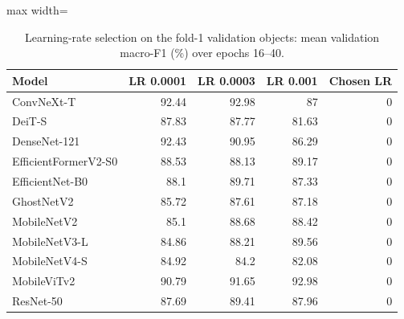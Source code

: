 \begin{table}[!htbp]
\centering
\scriptsize
\caption{Learning-rate selection on the fold-1 validation objects: mean validation macro-F1 (\%) over epochs 16--40.}
\label{tab:s_lr}
\begin{adjustbox}{max width=\textwidth}
\begin{tabular}{@{}lrrrr@{}}
\toprule
Model & LR 0.0001 & LR 0.0003 & LR 0.001 & Chosen LR \\
\midrule
ConvNeXt-T & 92.44 & 92.98 & 87 & 0 \\
DeiT-S & 87.83 & 87.77 & 81.63 & 0 \\
DenseNet-121 & 92.43 & 90.95 & 86.29 & 0 \\
EfficientFormerV2-S0 & 88.53 & 88.13 & 89.17 & 0 \\
EfficientNet-B0 & 88.1 & 89.71 & 87.33 & 0 \\
GhostNetV2 & 85.72 & 87.61 & 87.18 & 0 \\
MobileNetV2 & 85.1 & 88.68 & 88.42 & 0 \\
MobileNetV3-L & 84.86 & 88.21 & 89.56 & 0 \\
MobileNetV4-S & 84.92 & 84.2 & 82.08 & 0 \\
MobileViTv2 & 90.79 & 91.65 & 92.98 & 0 \\
ResNet-50 & 87.69 & 89.41 & 87.96 & 0 \\
\bottomrule
\end{tabular}
\end{adjustbox}
\end{table}

